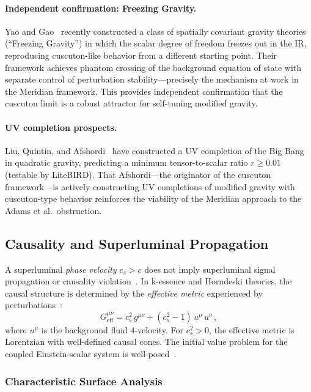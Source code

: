 \paragraph{Independent confirmation: Freezing Gravity.}
Yao and Gao~\cite{ch5:YaoGao2025} recently constructed a class of spatially covariant gravity theories (``Freezing Gravity'') in which the scalar degree of freedom freezes out in the IR, reproducing cuscuton-like behavior from a different starting point. Their framework achieves phantom crossing of the background equation of state with separate control of perturbation stability---precisely the mechanism at work in the Meridian framework. This provides independent confirmation that the cuscuton limit is a robust attractor for self-tuning modified gravity.

\paragraph{UV completion prospects.}
Liu, Quintin, and Afshordi~\cite{ch5:LiuQuintinAfshordi2026} have constructed a UV completion of the Big Bang in quadratic gravity, predicting a minimum tensor-to-scalar ratio $r \geq 0.01$ (testable by LiteBIRD). That Afshordi---the originator of the cuscuton framework---is actively constructing UV completions of modified gravity with cuscuton-type behavior reinforces the viability of the Meridian approach to the Adams et al.\ obstruction.

\subsection{Causality and Superluminal Propagation}
\label{sec:5-causality}

A superluminal \emph{phase velocity} $c_s > c$ does not imply superluminal signal propagation or causality violation~\cite{ch5:Babichev2008,ch5:Ellis2007}. In k-essence and Horndeski theories, the causal structure is determined by the \emph{effective metric} experienced by perturbations~\cite{ch5:Bekenstein1993}:
\begin{equation}
  G^{\mu\nu}_\mathrm{eff} = c_s^2\,g^{\mu\nu} + (c_s^2 - 1)\,u^\mu\,u^\nu\,,
  \label{eq:5-16}
\end{equation}
where $u^\mu$ is the background fluid 4-velocity. For $c_s^2 > 0$, the effective metric is Lorentzian with well-defined causal cones. The initial value problem for the coupled Einstein-scalar system is well-posed~\cite{ch5:Faraoni2009}.

\subsubsection{Characteristic Surface Analysis}

